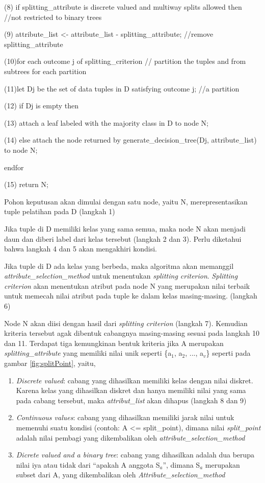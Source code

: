 (8) if splitting\_attribute is discrete valued and
				multiway splits allowed then //not restricted to binary trees

(9) attribute\_list <- attribute\_list - splitting\_attribute; //remove splitting\_attribute

(10)for each outcome j of splitting\_criterion // partition the tuples and from subtrees for each partition

(11)let D\lowercase{j} be the set of data tuples in D satisfying outcome j; //a partition

(12) if D\lowercase{j} is empty then

(13) attach a leaf labeled with the majority class in D to node N;

(14) else attach the node returned by generate\_decision\_tree(D\lowercase{j}, attribute\_list) to node N;

endfor

(15) return N;

Pohon keputusan akan dimulai dengan satu node, yaitu N, merepresentasikan tuple pelatihan pada D (langkah 1)

Jika tuple di D memiliki kelas yang sama semua, maka node N akan menjadi daun dan diberi label dari kelas tersebut (langkah 2 dan 3). Perlu diketahui bahwa langkah 4 dan 5 akan mengakhiri kondisi.

Jika tuple di D ada kelas yang berbeda, maka algoritma akan memanggil \textsl{attribute\_selection\_method} untuk menentukan \textsl{splitting criterion}. \textsl{Splitting criterion} akan menentukan atribut pada node N yang merupakan nilai terbaik untuk memecah nilai atribut pada tuple ke dalam kelas masing-masing. (langkah 6)

Node N akan diisi dengan hasil dari \textsl{splitting criterion} (langkah 7). Kemudian kriteria tersebut agak dibentuk cabangnya masing-masing sesuai pada langkah 10 dan 11. Terdapat tiga kemungkinan bentuk kriteria jika A merupakan \textsl{splitting\_attribute} yang memiliki nilai unik seperti \{a$_{1}$, a$_{2}$, ..., a$_{v}$\} seperti pada gambar \ref{fig:splitPoint}, yaitu,

\begin{enumerate}
	\item \textsl{Discrete valued}: cabang yang dihasilkan memiliki kelas dengan nilai diskret. Karena kelas yang dihasilkan diskret dan hanya memiliki nilai yang sama pada cabang tersebut, maka \textsl{attribut\_list} akan dihapus (langkah 8 dan 9)
	\item \textsl{Continuous values}: cabang yang dihasilkan memiliki jarak nilai untuk memenuhi suatu kondisi (contoh: A <= split\_point), dimana nilai \textsl{split\_point} adalah nilai pembagi yang dikembalikan oleh \textsl{attribute\_selection\_method}
	\item \textsl{Dicrete valued and a binary tree}: cabang yang dihasilkan adalah dua berupa nilai iya atau tidak dari "`apakah A anggota S$_{a}$"', dimana S$_{a}$ merupakan subset dari A, yang dikembalikan oleh \textsl{Attribute\_selection\_method}
\end{enumerate}


